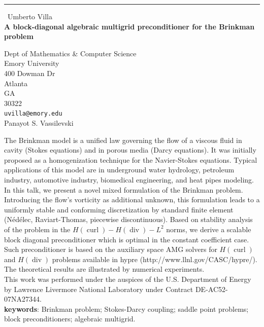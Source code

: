 \documentclass{report}
\begin{document}
\begin{center}
\rule{6in}{1pt} \
{\large Umberto Villa \\
{\bf A block-diagonal algebraic multigrid preconditioner for the Brinkman problem}}

Dept of Mathematics & Computer Science \\ Emory University \\ 400 Dowman Dr \\ Atlanta \\ GA \\ 30322
\\
{\tt uvilla@emory.edu}\\
Panayot S. Vassilevski\end{center}

\newcommand{\curl}{\operatorname{curl}}
\renewcommand{\div}{\operatorname{div}}

The Brinkman model is a unified law governing the flow of a viscous fluid
in cavity (Stokes equations) and in porous media (Darcy equations).
It was initially proposed as a homogenization technique for the Navier-Stokes equations.
Typical applications of this model are in underground water hydrology,
petroleum industry, automotive industry, biomedical engineering, and heat
pipes modeling.
In this talk, we present a novel mixed formulation of the Brinkman
problem. Introducing the flow's vorticity as additional unknown, this
formulation leads to a uniformly stable and conforming discretization by
standard finite element (N\'ed\'elec, Raviart-Thomas, piecewise
discontinuous). Based on stability analysis of the problem in the
$H(\curl)-H(\div)-L^2$ norms, we derive a scalable block diagonal
preconditioner which is optimal in the constant coefficient case. Such
preconditioner is based on the auxiliary space AMG solvers for $H(\curl)$
and $H(\div)$ problems available in hypre
(http://www.llnl.gov/CASC/hypre/). The theoretical results are
illustrated by numerical experiments.\\

This work was performed under the auspices of the U.S. Department
of Energy by Lawrence Livermore National Laboratory under Contract
DE-AC52-07NA27344.\\

{\bf keywords}: Brinkman problem; Stokes-Darcy coupling; saddle point
problems; block preconditioners; algebraic multigrid.
\end{document}
